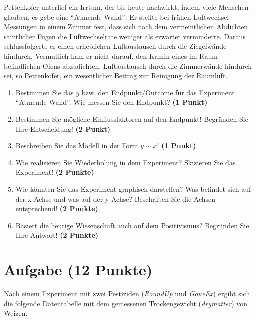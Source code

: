 \documentclass[a4paper, 10pt]{scrartcl}\usepackage[]{graphicx}\usepackage[]{color}
\begin{document}
\begin{shaded}
  Pettenkofer unterlief ein Irrtum, der bis heute
  nachwirkt, indem viele Menschen glauben, es gebe eine ``Atmende Wand'':
  Er stellte bei fr{\"u}hen Luftwechsel-Messungen in einem Zimmer fest, dass
  sich nach dem vermeintlichen Abdichten s{\"a}mtlicher Fugen die
  Luftwechselrate weniger als erwartet verminderte. Daraus schlussfolgerte
  er einen erheblichen Luftaustausch durch die Ziegelw{\"a}nde
  hindurch. Vermutlich kam er nicht darauf, den Kamin eines im Raum
  befindlichen Ofens abzudichten. Luftaustausch durch die Zimmerw{\"a}nde
  hindurch sei, so Pettenkofer, ein wesentlicher Beitrag zur Reinigung der
  Raumluft.
\end{shaded}

\begin{enumerate}
\item Bestimmen Sie das $y$ bzw. den Endpunkt/Outcome f{\"u}r das Experiment ``Atmende Wand''. Wie
  messen Sie den Endpunkt? \textbf{(1 Punkt)}
\item Bestimmen Sie m{\"o}gliche Einflussfaktoren auf den Endpunkt! Begründen Sie Ihre Entscheidung! \textbf{(2 Punkt)}
\item Beschreiben Sie das Modell in der Form $y \sim x$! \textbf{(1 Punkt)}
\item Wie realisieren Sie Wiederholung in
  dem Experiment? Skizieren Sie das Experiment! \textbf{(2 Punkte)}
\item Wie k{\"o}nnten Sie das Experiment graphisch darstellen? Was befindet
  sich auf der x-Achse und was auf der y-Achse? Beschriften Sie die Achsen entsprechend!
  \textbf{(2 Punkte)}
\item Basiert die heutige Wissenschaft auch auf dem Positivismus? Begründen Sie Ihre Antwort! \textbf{(2 Punkte)}
\end{enumerate}
 
\clearpage

\section{Aufgabe \hfill (12 Punkte)}

Nach einem Experiment mit zwei Pestiziden (\textit{RoundUp} und
\textit{GoneEx}) ergibt sich die folgende Datentabelle mit dem gemessenen
Trockengewicht (\textit{drymatter}) von Weizen.
\end{document}
